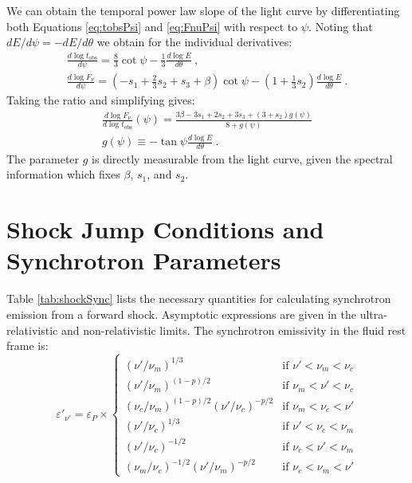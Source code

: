 \documentclass[modern]{aastex62}
\newcommand{\tobs}{\ensuremath{t_{\mathrm{obs}}}}
\begin{document}
	We can obtain the temporal power law slope of the light curve by differentiating both Equations \eqref{eq:tobsPsi} and \eqref{eq:FnuPsi} with respect to $\psi$.  Noting that $dE/d\psi = -dE/d\theta$ we obtain for the individual derivatives:
\begin{eqnarray}
	\frac{d \log \tobs}{d \psi} = \frac{8}{3} \cot \psi - \frac{1}{3} \frac{d \log E}{d \theta}\ , \\
	\frac{d \log F_\nu}{d \psi} = \left(-s_1 + \frac{2}{3} s_2 +s_3+\beta\right)\cot \psi - \left(1+\frac{1}{3}s_2\right) \frac{d \log E}{d \theta}\ .
\end{eqnarray}
Taking the ratio and simplifying gives:
\begin{eqnarray}
	\frac{d \log F_\nu}{d \log \tobs}(\psi) = \frac{3 \beta - 3s_1 + 2s_2+3s_3 + (3+s_2)g(\psi)}{ 8+g(\psi)} \\
	g(\psi) \equiv -\tan \psi \frac{d \log E}{d \theta}\ .
\end{eqnarray}
The parameter $g$ is directly measurable from the light curve, given the spectral information which fixes $\beta$, $s_1$, and $s_2$.


\section{Shock Jump Conditions and Synchrotron Parameters}
\label{sec:shockJump}

Table \ref{tab:shockSync} lists the necessary quantities for calculating synchrotron emission from a forward shock.  Asymptotic expressions are given in the ultra-relativistic and non-relativistic limits.  The synchrotron emissivity in the fluid rest frame is:
\begin{equation}
	\varepsilon'_{\nu'} = \varepsilon_P \times \left \{ \begin{matrix}
											\left(\nu' / \nu_m\right)^{1/3} & \text{if } \nu' < \nu_m < \nu_c \\
											\left(\nu' / \nu_m\right)^{(1-p)/2} & \text{if } \nu_m < \nu'  < \nu_c \\
											\left(\nu_c/\nu_m\right)^{(1-p)/2}\left(\nu' / \nu_c\right)^{-p/2} & \text{if }\nu_m < \nu_c < \nu'\\
											\left(\nu' / \nu_c\right)^{1/3} & \text{if } \nu' < \nu_c < \nu_m \\
											\left(\nu' / \nu_c\right)^{-1/2} & \text{if } \nu_c <\nu' <  \nu_m \\
											\left(\nu_m / \nu_c\right)^{-1/2}\left(\nu' / \nu_m\right)^{-p/2} & \text{if } \nu_c < \nu_m < \nu'
											\end{matrix} \right .
\end{equation}
\end{document}
